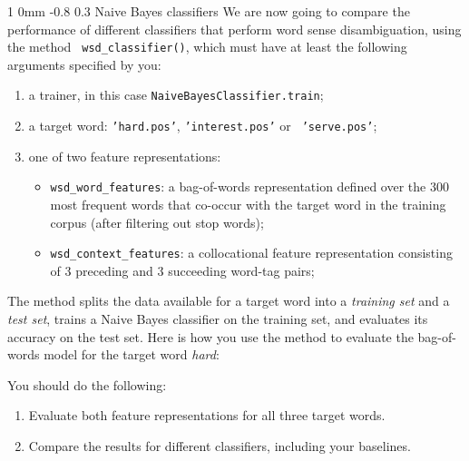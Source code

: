\documentclass[11pt]{article}
\makeatletter
\newcommand{\newsec}[2]{\section{#1}\label{sec:#2}\noindent}
\renewcommand{\section}{\@startsection
{section}%
{1}%
{0mm}%
{-0.8\baselineskip}%
{0.3\baselineskip}%
{\bfseries\large}}%
\makeatother
\begin{document}
\newsec{Naive Bayes classifiers }{naive}%
We are now going to compare the performance of different classifiers
that perform word sense disambiguation, using the method {\tt
  wsd\_classifier()}, which must have at least the following arguments
specified by you:
\begin{enumerate}[topsep=0.2cm,noitemsep]
\item a trainer, in this case {\tt NaiveBayesClassifier.train};
\item a target word: {\tt 'hard.pos'}, {\tt 'interest.pos'} or {\tt
    'serve.pos'};
\item one of two feature representations:
\begin{itemize}[noitemsep,topsep=0.1cm]
\item {\tt wsd\_word\_features}: a bag-of-words representation defined
  over the 300 most frequent words that co-occur with the target word
  in the training corpus (after filtering out stop words);
\item {\tt wsd\_context\_features}: a collocational feature
  representation consisting of 3 preceding and 3 succeeding word-tag
  pairs;
\end{itemize}
\end{enumerate}
The method splits the data available for a target word into a {\em
  training set} and a {\em test set}, trains a Naive Bayes classifier
on the training set, and evaluates its accuracy on the test set. Here
is how you use the method to evaluate the bag-of-words model for the
target word \emph{hard}:
\begin{center}
\fbox{
\scalebox{0.8}{

}}
\end{center}
You should do the following:
\begin{enumerate}[noitemsep,topsep=0.2cm]
\item  Evaluate both feature representations for all three target words.
\item  Compare the results for different classifiers, including your baselines.
\end{enumerate}
\end{document}
